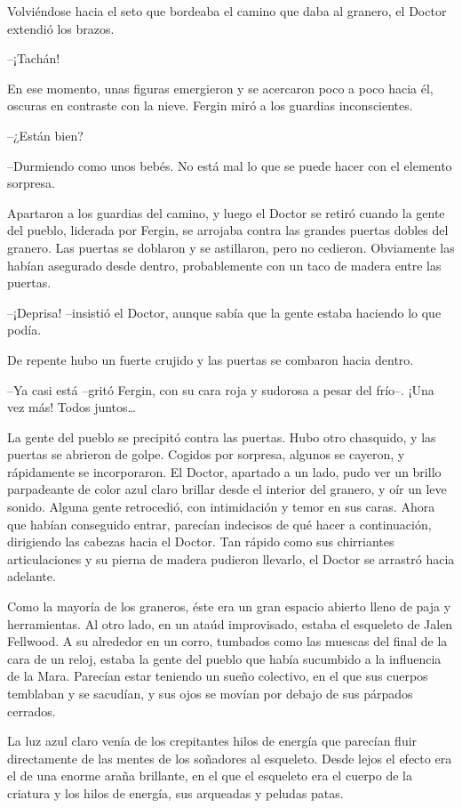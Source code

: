 Volviéndose hacia el seto que bordeaba el camino que daba al granero, el Doctor extendió los brazos.

--¡Tachán!

En ese momento, unas figuras emergieron y se acercaron poco a poco hacia él, oscuras en contraste con la nieve. Fergin miró a los guardias inconscientes.

--¿Están bien?

--Durmiendo como unos bebés. No está mal lo que se puede hacer con el elemento sorpresa.

Apartaron a los guardias del camino, y luego el Doctor se retiró cuando la gente del pueblo, liderada por Fergin, se arrojaba contra las grandes puertas dobles del granero. Las puertas se doblaron y se astillaron, pero no cedieron. Obviamente las habían asegurado desde dentro, probablemente con un taco de madera entre las puertas.

--¡Deprisa! --insistió el Doctor, aunque sabía que la gente estaba haciendo lo que podía.

De repente hubo un fuerte crujido y las puertas se combaron hacia dentro. 

--Ya casi está --gritó Fergin, con su cara roja y sudorosa a pesar del frío--. ¡Una vez más! Todos juntos…

La gente del pueblo se precipitó contra las puertas. Hubo otro chasquido, y las puertas se abrieron de golpe. Cogidos por sorpresa, algunos se cayeron, y rápidamente se incorporaron. El Doctor, apartado a un lado, pudo ver un brillo parpadeante de color azul claro brillar desde el interior del granero, y oír un leve sonido. Alguna gente retrocedió, con intimidación y temor en sus caras. Ahora que habían conseguido entrar, parecían indecisos de qué hacer a continuación, dirigiendo las cabezas hacia el Doctor. Tan rápido como sus chirriantes articulaciones y su pierna de madera pudieron llevarlo, el Doctor se arrastró hacia adelante.

Como la mayoría de los graneros, éste era un gran espacio abierto lleno de paja y herramientas. Al otro lado, en un ataúd improvisado, estaba el esqueleto de Jalen Fellwood. A su alrededor en un corro, tumbados como las muescas del final de la cara de un reloj, estaba la gente del pueblo que había sucumbido a la influencia de la Mara. Parecían estar teniendo un sueño colectivo, en el que sus cuerpos temblaban y se sacudían, y sus ojos se movían por debajo de sus párpados cerrados.

La luz azul claro venía de los crepitantes hilos de energía que parecían fluir directamente de las mentes de los soñadores al esqueleto. Desde lejos el efecto era el de una enorme araña brillante, en el que el esqueleto era el cuerpo de la criatura y los hilos de energía, sus arqueadas y peludas patas.

